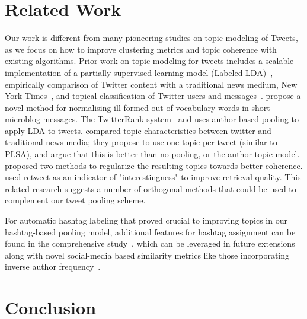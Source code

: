 \documentclass{sig-alternate}
\newcommand{\secmoveup}{\vspace{-1.mm}}
\begin{document}
\section{Related Work}

\label{sec:related_work}

Our work is different from many pioneering studies
on topic modeling of Tweets, as we focus on how to
improve clustering metrics and topic coherence with existing algorithms.
Prior work on topic modeling for tweets includes 
a scalable implementation of a partially
supervised learning model (Labeled LDA)~\cite{ramage}, 
empirically comparison of
Twitter content with a traditional news medium, New York Times~\cite{wayne},
and topical classification of
Twitter users and messages~\cite{hong}. 
\cite{han2012tist} propose a novel method for normalising
ill-formed out-of-vocabulary words in short microblog messages.  The
{T}witterRank system~\cite{Weng2010wsdm} and \cite{hong} uses
author-based pooling to apply LDA to tweets. \cite{wayne} compared
topic characteristics between twitter and traditional news media; they
propose to use one topic per tweet (similar to PLSA), and argue that
this is better than no pooling, or the author-topic model.
\cite{newman11} proposed two methods to regularize the
resulting topics towards better coherence.
\cite{Naveed2011cikm} %
used retweet as an indicator of "interestingness" to improve retrieval
quality.  This related research suggests a number of orthogonal
methods that could be used to complement our tweet pooling scheme.

For automatic hashtag labeling that proved crucial to improving topics
in our hashtag-based pooling model, additional features for hashtag
assignment can be found in the comprehensive study~\cite{yang2012www},
which can be leveraged in future extensions along with novel 
social-media based similarity metrics like those incorporating inverse
author frequency~\cite{iaf}. %

\secmoveup
\section{Conclusion}

\label{sec:conclusion}
\end{document}
